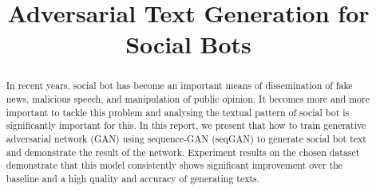 \documentclass[conference]{IEEEtran}
\begin{document}
	
\title{Adversarial Text Generation for Social Bots}

\author{
	\and
	\and
	\and
}

\maketitle

\begin{abstract}
	
    In recent years, social bot has become an important means of dissemination of fake news, malicious speech, and manipulation of public opinion. It becomes more and more important to tackle this problem and analysing the textual pattern of social bot is significantly important for this. In this report, we present that how to train generative adversarial network (GAN) using sequence-GAN (seqGAN) to generate social bot text and demonstrate the result of the network. Experiment results on the chosen dataset demonstrate that this model consistently shows significant improvement over the baseline and a high quality and accuracy of generating texts.

\end{abstract}
\end{document}
